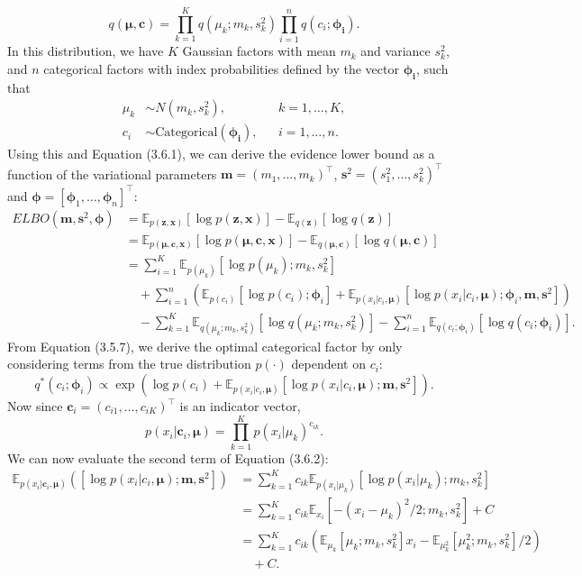 \documentclass[honours,12pt]{unswthesis}
\numberwithin{equation}{section}
\theoremstyle{definition}
\begin{document}
\[q(\bm{\mu},\bm{c})=\prod^K_{k=1}q(\mu_k;m_k,s^2_k)\prod^n_{i=1}q(c_i;\bm{\phi_i}).\]
In this distribution, we have $K$ Gaussian factors with mean $m_k$ and variance $s^2_k$, and $n$ categorical factors with index probabilities defined by the vector $\bm{\phi_i}$, such that
\begin{align*}
\mu_k&\sim N(m_k,s^2_k), &&k=1,\dots,K,\\
c_i&\sim \text{Categorical}(\bm{\phi_i}), &&i=1,\dots,n.
\end{align*}
Using this and Equation (3.6.1), we can derive the evidence lower bound as a function of the variational parameters $\bm{m}=(m_1,\dots,m_k)^\top$, $\bm{s}^2=(s_1^2,\dots,s_k^2)^\top$ and $\bm{\phi}=[\bm{\phi}_1,\dots,\bm{\phi}_n]^\top$:
\begin{align*}
ELBO(\bm{m},\bm{s}^2,\bm{\phi})&=\mathbb{E}_{p(\textbf{z},\bm{x})}[\log p(\textbf{z},\bm{x})]-\mathbb{E}_{q(\bm{z})}[\log q(\bm{z})]\\
&=\mathbb{E}_{p(\bm{\mu,c},\textbf{x})}[\log p(\bm{\mu,c},\textbf{x})]-\mathbb{E}_{q(\bm{\mu,c})}[\log q(\bm{\mu,c})]\\
&=\sum^K_{i=1}\mathbb{E}_{p(\mu_k)}[\log p(\mu_k); m_k,s^2_k]\\
&\quad +\sum^n_{i=1}\left(\mathbb{E}_{p(c_i)}[\log p(c_i);\bm{\phi}_i]+\mathbb{E}_{p(x_i|c_i,\bm{\mu})}[\log p(x_i|c_i,\bm{\mu});\bm{\phi}_i,\bm{m},\bm{s}^2]\right)\\
&\quad -\sum^K_{k=1}\mathbb{E}_{q(\mu_k;m_k,s^2_k)}[\log q(\mu_k;m_k,s^2_k)]-\sum^n_{i=1}\mathbb{E}_{q(c_i;\bm{\phi}_i)}[\log q(c_i;\bm{\phi}_i)].
\end{align*}
From Equation (3.5.7), we derive the optimal categorical factor by only considering terms from the true distribution $p(\cdot)$ dependent on $c_i$:
\begin{equation}
q^*(c_i;\bm{\phi}_i)\propto \exp\left(\log p(c_i)+\mathbb{E}_{p(x_i|c_i,\bm{\mu})}[\log p(x_i|c_i,\bm{\mu});\bm{m},\bm{s}^2]\right).
\end{equation}
Now since $\bm{c}_i=(c_{i1},\dots,c_{iK})^\top$ is an indicator vector,
\[p(x_i|\bm{c}_i,\bm{\mu})=\prod^K_{k=1}p(x_i|\mu_k)^{c_{ik}}.\]
We can now evaluate the second term of Equation (3.6.2):
\begin{align*}
\mathbb{E}_{p(x_i|\bm{c}_i,\bm{\mu})}\left([\log p(x_i|c_i,\bm{\mu});\bm{m},\bm{s}^2]\right)&=\sum_{k=1}^K c_{ik}\mathbb{E}_{p(x_i|\mu_k)}[\log p(x_i|\mu_k);m_k,s^2_k]\\
&=\sum_{k=1}^K c_{ik}\mathbb{E}_{x_i}[-(x_i-\mu_k)^2/2;m_k,s^2_k]+C\\
&=\sum_{k=1}^Kc_{ik}\left(\mathbb{E}_{\mu_k}[\mu_k;m_k,s^2_k]x_i-\mathbb{E}_{\mu_k^2}[\mu^2_k;m_k,s^2_k]/2\right)\\
&\quad +C.
\end{align*}
\end{document}
